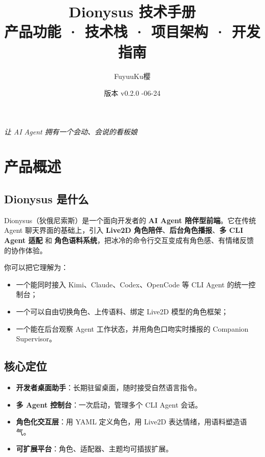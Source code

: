 \documentclass[12pt,a4paper]{article}
\title{\textbf{Dionysus 技术手册}\\[0.3em]\large 产品功能 · 技术栈 · 项目架构 · 开发指南}
\author{FuyuuKu樱}
\date{版本 v0.2.0 \quad 2026-06-24}
\begin{document}
\maketitle
\thispagestyle{empty}

\vfill
\begin{center}
\textit{让 AI Agent 拥有一个会动、会说的看板娘}
\end{center}
\vfill

\newpage
\tableofcontents
\newpage

\section{产品概述}

\subsection{Dionysus 是什么}

Dionysus（狄俄尼索斯）是一个面向开发者的 \textbf{AI Agent 陪伴型前端}。它在传统 Agent 聊天界面的基础上，引入 \textbf{Live2D 角色陪伴}、\textbf{后台角色播报}、\textbf{多 CLI Agent 适配} 和 \textbf{角色语料系统}，把冰冷的命令行交互变成有角色感、有情绪反馈的协作体验。

你可以把它理解为：

\begin{itemize}[leftmargin=2em]
  \item 一个能同时接入 Kimi、Claude、Codex、OpenCode 等 CLI Agent 的统一控制台；
  \item 一个可以自由切换角色、上传语料、绑定 Live2D 模型的角色框架；
  \item 一个能在后台观察 Agent 工作状态，并用角色口吻实时播报的 Companion Supervisor。
\end{itemize}

\subsection{核心定位}

\begin{itemize}[leftmargin=2em]
  \item \textbf{开发者桌面助手}：长期驻留桌面，随时接受自然语言指令。
  \item \textbf{多 Agent 控制台}：一次启动，管理多个 CLI Agent 会话。
  \item \textbf{角色化交互层}：用 YAML 定义角色，用 Live2D 表达情绪，用语料塑造语气。
  \item \textbf{可扩展平台}：角色、适配器、主题均可插拔扩展。
\end{itemize}
\end{document}
